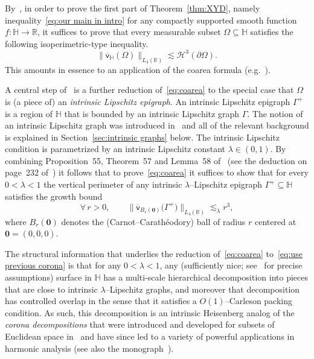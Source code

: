 \documentclass[11pt,reqno]{amsart}
\renewcommand{\H}{\mathbb{H}}
\newcommand{\R}{\mathbb{R}}
\newcommand{\cH}{\mathcal{H}}
\newcommand{\0}{\mathbf{0}}
\renewcommand{\1}{\mathbf 1}
\newcommand{\from}{\colon}
\renewcommand{\subset}{\subseteq}
\theoremstyle{remark}
\newcommand{\vpfl}[1]{{\overline{\mathsf{v}}_{\!#1}}}
\begin{document}
By~\cite[Lemma~38]{NY18}, in order to prove the first part of Theorem~\ref{thm:XYD}, namely inequality~\eqref{eq:our main in intro} for any compactly supported smooth function $f\from \H\to \R$, it suffices to prove that every measurable subset $\Omega\subset \H$ satisfies the following isoperimetric-type inequality.
\begin{equation}\label{eq:coarea}
\big\|\vpfl{\H}(\Omega)\big\|_{L_4(\R)}\lesssim \cH^3(\partial \Omega).
\end{equation}
This amounts in essence to an application of the coarea formula (e.g.~\cite{Amb01}).

A central step of~\cite{NY18} is a further reduction of~\eqref{eq:coarea} to the special case that $\Omega$ is (a piece of) an   {\em intrinsic Lipschitz epigraph}.  An intrinsic Lipschitz epigraph $\Gamma^+$ is a region of $\H$ that is bounded by an intrinsic Lipschitz graph $\Gamma$.  The notion of an intrinsic Lipschitz graph was introduced in~\cite{FSSC06} and all of the relevant background is explained in Section~\ref{sec:intrinsic graphs} below.  The intrinsic Lipschitz condition is parametrized by an intrinsic Lipschitz constant $\lambda\in (0,1)$.  By combining Proposition~55, Theorem~57 and Lemma~58 of~\cite{NY18} (see the deduction on page~232 of~\cite{NY18}) it follows that to prove~\eqref{eq:coarea} it suffices to show that for every  $0<\lambda<1$ the vertical perimeter of any intrinsic $\lambda$--Lipschitz epigraph $\Gamma^+\subset \H$ satisfies the growth bound
\begin{equation}\label{eq:use previous corona}
\forall\, r>0,\qquad \big\|\vpfl{B_r(\0)}\big(\Gamma^+\big)\big\|_{L_4(\R)}\lesssim_\lambda r^3,
\end{equation}
where  $B_r(\0)$ denotes the (Carnot--Carath\'eodory) ball   of radius $r$  centered at $\0=(0,0,0)$.

The structural information that underlies the reduction of~\eqref{eq:coarea} to~\eqref{eq:use previous corona}  is that for any $0<\lambda<1$, any (sufficiently nice; see~\cite{NY18} for precise assumptions) surface in $\H$ has a multi-scale hierarchical decomposition into pieces that are close to intrinsic $\lambda$--Lipschitz graphs, and moreover that decomposition has controlled overlap in the sense that it satisfies  a $O(1)$--Carleson packing condition. As such, this decomposition is an intrinsic Heisenberg analog of the {\em corona decompositions} that were introduced and developed for subsets of Euclidean space in~\cite{DavidSemmesSingular} and have since led to a variety of powerful applications in harmonic analysis (see also the monograph~\cite{DSAnalysis}).
\end{document}
